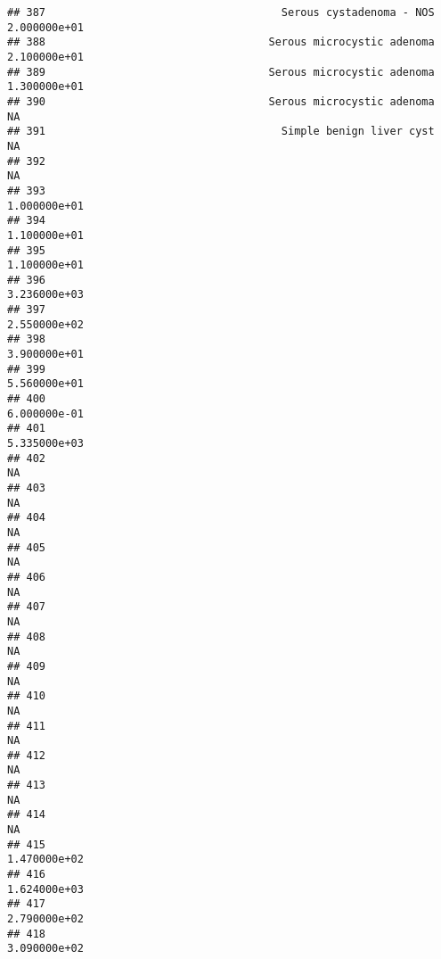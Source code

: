 \documentclass[
]{article}
\begin{document}
\begin{verbatim}
## 387                                     Serous cystadenoma - NOS  2.000000e+01
## 388                                   Serous microcystic adenoma  2.100000e+01
## 389                                   Serous microcystic adenoma  1.300000e+01
## 390                                   Serous microcystic adenoma            NA
## 391                                     Simple benign liver cyst            NA
## 392                                                                         NA
## 393                                                               1.000000e+01
## 394                                                               1.100000e+01
## 395                                                               1.100000e+01
## 396                                                               3.236000e+03
## 397                                                               2.550000e+02
## 398                                                               3.900000e+01
## 399                                                               5.560000e+01
## 400                                                               6.000000e-01
## 401                                                               5.335000e+03
## 402                                                                         NA
## 403                                                                         NA
## 404                                                                         NA
## 405                                                                         NA
## 406                                                                         NA
## 407                                                                         NA
## 408                                                                         NA
## 409                                                                         NA
## 410                                                                         NA
## 411                                                                         NA
## 412                                                                         NA
## 413                                                                         NA
## 414                                                                         NA
## 415                                                               1.470000e+02
## 416                                                               1.624000e+03
## 417                                                               2.790000e+02
## 418                                                               3.090000e+02

\end{verbatim}
\end{document}
